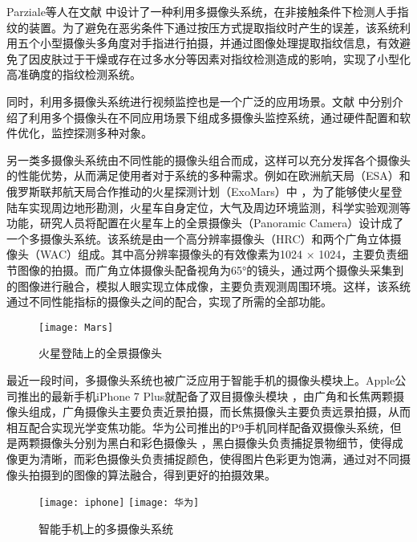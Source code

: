 Parziale等人在文献 \cite{parziale2006surround} 中设计了一种利用多摄像头系统，在非接触条件下检测人手指纹的装置。为了避免在恶劣条件下通过按压方式提取指纹时产生的误差，该系统利用五个小型摄像头多角度对手指进行拍摄，并通过图像处理提取指纹信息，有效避免了因皮肤过于干燥或存在过多水分等因素对指纹检测造成的影响，实现了小型化高准确度的指纹检测系统。

同时，利用多摄像头系统进行视频监控也是一个广泛的应用场景。文献 \cite{taj2009multi, bellotto2009distributed, fiore2008multi, kettnaker1999bayesian} 中分别介绍了利用多个摄像头在不同应用场景下组成多摄像头监控系统，通过硬件配置和软件优化，监控探测多种对象。

另一类多摄像头系统由不同性能的摄像头组合而成，这样可以充分发挥各个摄像头的性能优势，从而满足使用者对于系统的多种需求。例如在欧洲航天局（ESA）和俄罗斯联邦航天局合作推动的火星探测计划（ExoMars）中 \cite{9, 10}，为了能够使火星登陆车实现周边地形勘测，火星车自身定位，大气及周边环境监测，科学实验观测等功能，研究人员将配置在火星车上的全景摄像头（Panoramic Camera）设计成了一个多摄像头系统。该系统是由一个高分辨率摄像头（HRC）和两个广角立体摄像头（WAC）组成。其中高分辨率摄像头的有效像素为1024 × 1024，主要负责细节图像的拍摄。而广角立体摄像头配备视角为65°的镜头，通过两个摄像头采集到的图像进行融合，模拟人眼实现立体成像，主要负责观测周围环境。这样，该系统通过不同性能指标的摄像头之间的配合，实现了所需的全部功能。

\begin{figure}[H] 
  \centering
  \texttt{[image: Mars]}
  \caption{火星登陆上的全景摄像头}
  \label{Mars}
\end{figure}

最近一段时间，多摄像头系统也被广泛应用于智能手机的摄像头模块上。Apple公司推出的最新手机iPhone 7 Plus就配备了双目摄像头模块 \cite{iphone}，由广角和长焦两颗摄像头组成，广角摄像头主要负责近景拍摄，而长焦摄像头主要负责远景拍摄，从而相互配合实现光学变焦功能。华为公司推出的P9手机同样配备双摄像头系统，但是两颗摄像头分别为黑白和彩色摄像头 \cite{华为}，黑白摄像头负责捕捉景物细节，使得成像更为清晰，而彩色摄像头负责捕捉颜色，使得图片色彩更为饱满，通过对不同摄像头拍摄到的图像的算法融合，得到更好的拍摄效果。

\begin{figure}[h]
  \centering%
    {\texttt{[image: iphone]}}
    \hspace{4em}%
      {\texttt{[image: 华为]}}
  \caption{智能手机上的多摄像头系统}
\end{figure}

